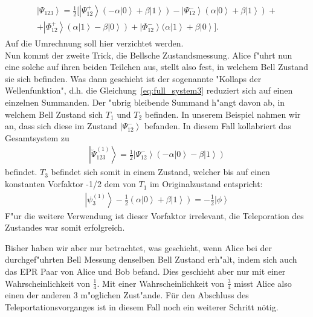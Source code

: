 \begin{refsection}
\begin{align}\label{eq:full_system3}
	\begin{split}
\left| \Psi_{123} \right\rangle = \frac{1}{2} \Bigg[ \left| \Psi_{12}^{+} \right\rangle (-\alpha \left| 0 \right\rangle + \beta \left| 1 \right\rangle) - \left| \Psi_{12}^{-} \right\rangle (\alpha \left| 0 \right\rangle + \beta \left| 1 \right\rangle ) +
\\
+ \left| \Phi_{12}^{+} \right\rangle (\alpha \left| 1 \right\rangle - \beta \left| 0 \right\rangle) + \left| \Phi_{12}^{-} \right\rangle (\alpha \left| 1 \right\rangle + \beta \left| 0 \right\rangle
 \Bigg].
 \end{split}
\end{align}
Auf die Umrechnung soll hier verzichtet werden.
\\
Nun kommt der zweite Trick, die Bellsche Zustandsmessung. Alice f"uhrt nun eine solche auf ihren beiden Teilchen aus, stellt also fest, in welchem Bell Zustand sie sich befinden. Was dann geschieht ist der sogenannte "Kollaps der Wellenfunktion", d.h. die Gleichung~\ref{eq:full_system3} reduziert sich auf einen einzelnen Summanden. Der "ubrig bleibende Summand h"angt davon ab, in welchem Bell Zustand sich $T_{1}$ und $T_{2}$ befinden. In unserem Beispiel nahmen wir an, dass sich diese im Zustand $\left|\Psi_{12}^{-}\right\rangle$ befanden. In diesem Fall kollabriert das Gesamtsystem zu
\begin{align}
\left| \breve{\Psi}_{123}^{(1)} \right\rangle = \frac{1}{2} \left| \Psi_{12}^{-} \right \rangle (-\alpha \left| 0 \right \rangle - \beta \left| 1 \right\rangle)
\end{align}
befindet. $T_{3}$ befindet sich somit in einem Zustand, welcher bis auf einen konstanten Vorfaktor -1/2 dem von $T_{1}$ im Originalzustand entspricht:
\begin{align}
\left| \psi_{3}^{(1)} \right\rangle - \frac{1}{2} \left( \alpha \left| 0 \right \rangle + \beta \left| 1 \right \rangle \right ) = - \frac{1}{2} \left| \phi \right \rangle
\end{align}
F"ur die weitere Verwendung ist dieser Vorfaktor irrelevant, die Teleporation des Zustandes war somit erfolgreich. 

Bisher haben wir aber nur betrachtet, was geschieht, wenn Alice bei der durchgef"uhrten Bell Messung denselben Bell Zustand erh"alt, indem sich auch das EPR Paar von Alice und Bob befand. Dies geschieht aber nur mit einer Wahrscheinlichkeit von $\frac{1}{4}$. Mit einer Wahrscheinlichkeit von $\frac{3}{4}$ misst Alice also einen der anderen 3 m"oglichen Zust"ande. Für den Abschluss des Teleportationsvorganges ist in diesem Fall noch ein weiterer Schritt nötig.


\end{refsection}
